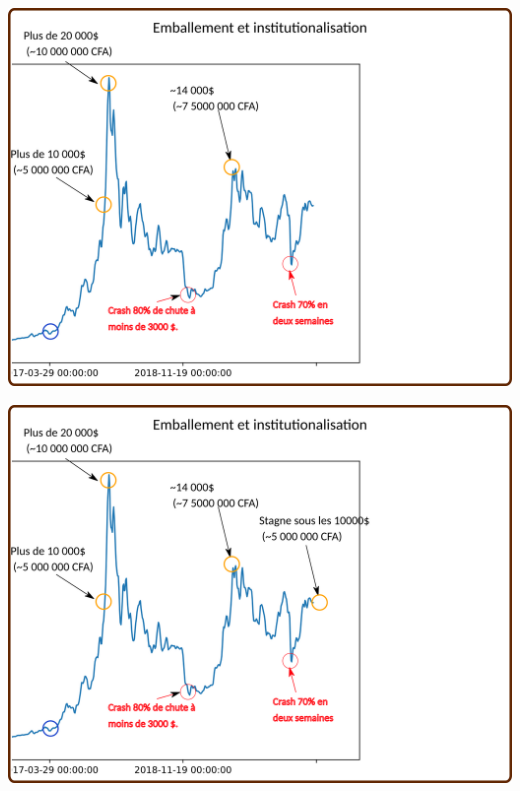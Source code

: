 \documentclass[presentation]{beamer}
\begin{document}
\begin{frame}[label={sec:org2a3c23d}]{}
\begin{center}
\includegraphics[width=.95\textwidth]{./Pictures/Timeline/44emballement_crash4.png}
\end{center}
\end{frame}

\begin{frame}[label={sec:orgc4b0909}]{}
\begin{center}
\includegraphics[width=.95\textwidth]{./Pictures/Timeline/45emballement_aujourdhui.png}
\end{center}
\end{frame}
\end{document}
